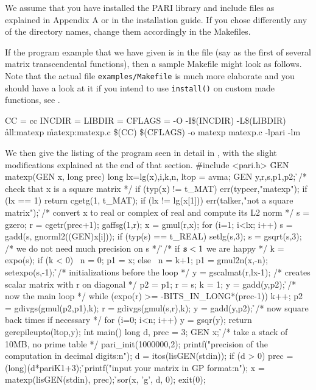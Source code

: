 
We assume that you have installed the PARI library and include files as
explained in Appendix A or in the installation guide. If you chose
differently any of the directory names, change them accordingly in the
Makefiles.

If the program example that we have given is in the file  (say
as the first of several matrix transcendental functions), then a sample
Makefile might look as follows. Note that the actual file
{\tt examples/Makefile} is much more elaborate and you should have a look at
it if you intend to use {\tt install()} on custom made functions, see
.

\bprog
CC = cc
INCDIR = 
LIBDIR = \libdir
CFLAGS = -O -I\$(INCDIR) -L\$(LIBDIR)
\h
all:\qquad matexp
\h
matexp:\qquad	matexp.c
\q\q \$(CC) \$(CFLAGS) -o matexp matexp.c -lpari -lm
\eprog

\noindent We then give the listing of the program 
seen in detail in , with the slight modifications explained
at the end of that section.
%
\bprog
\#include <pari.h>
\h
GEN
matexp(GEN x, long prec)
\obr
\q  long lx=lg(x),i,k,n, ltop = avma;
\q  GEN y,r,s,p1,p2;
\h
\q /* {\rm check that x is a square matrix} */
\q if (typ(x) != t\_MAT) err(typeer,"matexp");
\q if (lx == 1) return cgetg(1, t\_MAT);
\q if (lx != lg(x[1])) err(talker,"not a square matrix");
\h
\q /* {\rm convert x to real or complex of real and compute its L2 norm} */
\q s = gzero; r = cgetr(prec+1); gaffsg(1,r); x = gmul(r,x);
\q for (i=1; i<lx; i++)
\q\q s = gadd(s, gnorml2((GEN)x[i]));
\q if (typ(s) == t\_REAL) setlg(s,3);
\q s = gsqrt(s,3); /* {\rm we do not need much precision on s} */
\h
\q /* {\rm if ${\tt s}<1$ we are happy} */
\q k = expo(s);
\q if (k < 0) \obr\ n = 0; p1 = x; \cbr
\q else \obr\ n = k+1; p1 = gmul2n(x,-n); setexpo(s,-1); \cbr
\h
\q /* {\rm initializations before the loop} */
\q y = gscalmat(r,lx-1); /* {\rm creates scalar matrix with r on diagonal} */
\q p2 = p1; r = s; k = 1;
\q y = gadd(y,p2);
\h
\q /* {\rm now the main loop} */
\q while (expo(r) >= -BITS\_IN\_LONG*(prec-1))
\q\obr
\q\q k++; p2 = gdivgs(gmul(p2,p1),k);
\q\q r = gdivgs(gmul(s,r),k); y = gadd(y,p2);
\q\cbr
\h
\q /* {\rm now square back  times if necessary} */
\q for (i=0; i<n; i++) y = gsqr(y);
\q return gerepileupto(ltop,y);
\cbr
\h
int
main()
\obr
\q long d, prec = 3;
\q GEN x;
\h
\q /* {\rm take a stack of 10MB, no prime table} */
\q pari\_init(1000000,2);
\q printf("precision of the computation in decimal digits:\bs n");
\q d = itos(lisGEN(stdin));
\q if (d > 0) prec = (long)(d*pariK1+3);
\h
\q printf("input your matrix in GP format:\bs n");
\q x = matexp(lisGEN(stdin), prec);
\h
\q sor(x, 'g', d, 0);
\q exit(0);
\cbr
\eprog\vfill\eject
